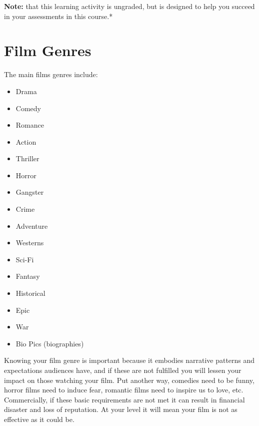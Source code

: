 \documentclass[
]{book}
\providecommand{\tightlist}{%
  \setlength{\itemsep}{0pt}\setlength{\parskip}{0pt}}
\begin{document}
\begin{caution}
\textbf{Note:} that this learning activity is ungraded, but is designed to help you succeed in your assessments in this course.*
\end{caution}

\hypertarget{film-genres}{%
\section{Film Genres}\label{film-genres}}

The main films genres include:

\begin{itemize}
\tightlist
\item
  Drama\\
\item
  Comedy\\
\item
  Romance\\
\item
  Action\\
\item
  Thriller\\
\item
  Horror\\
\item
  Gangster\\
\item
  Crime\\
\item
  Adventure\\
\item
  Westerns\\
\item
  Sci-Fi\\
\item
  Fantasy\\
\item
  Historical\\
\item
  Epic\\
\item
  War\\
\item
  Bio Pics (biographies)
\end{itemize}

Knowing your film genre is important because it embodies narrative patterns and expectations audiences have, and if these are not fulfilled you will lessen your impact on those watching your film. Put another way, comedies need to be funny, horror films need to induce fear, romantic films need to inspire us to love, etc. Commercially, if these basic requirements are not met it can result in financial disaster and loss of reputation. At your level it will mean your film is not as effective as it could be.
\end{document}
